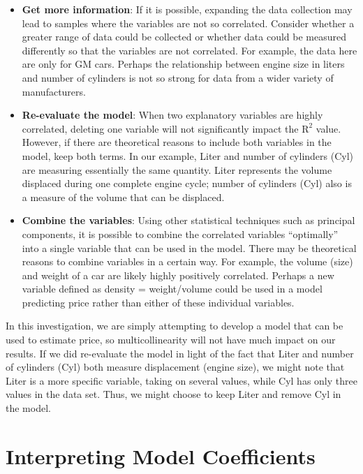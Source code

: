 \documentclass[
]{book}
\providecommand{\tightlist}{%
  \setlength{\itemsep}{0pt}\setlength{\parskip}{0pt}}
\begin{document}
\begin{itemize}
\tightlist
\item
  \textbf{Get more information}: If it is possible, expanding the data collection may lead to samples where the variables are not so correlated. Consider whether a greater range of data could be collected or whether data could be measured differently so that the variables are not correlated. For example, the data here are only for GM cars. Perhaps the relationship between engine size in liters and number of cylinders is not so strong for data from a wider variety of manufacturers.
\item
  \textbf{Re-evaluate the model}: When two explanatory variables are highly correlated, deleting one variable will not significantly impact the \(\mathrm{R}^2\) value. However, if there are theoretical reasons to include both variables in the model, keep both terms. In our example, Liter and number of cylinders (Cyl) are measuring essentially the same quantity. Liter represents the volume displaced during one complete engine cycle; number of cylinders (Cyl) also is a measure of the volume that can be displaced.
\item
  \textbf{Combine the variables}: Using other statistical techniques such as principal components, it is possible to combine the correlated variables ``optimally'' into a single variable that can be used in the model. There may be theoretical reasons to combine variables in a certain way. For example, the volume (size) and weight of a car are likely highly positively correlated. Perhaps a new variable defined as density = weight/volume could be used in a model predicting price rather than either of these individual variables.
\end{itemize}

In this investigation, we are simply attempting to develop a model that can be used to estimate price, so multicollinearity will not have much impact on our results. If we did re-evaluate the model in light of the fact that Liter and number of cylinders (Cyl) both measure displacement (engine size), we might note that Liter is a more specific variable, taking on several values, while Cyl has only three values in the data set. Thus, we might choose to keep Liter and remove Cyl in the model.

\hypertarget{interpreting-model-coefficients}{%
\section{Interpreting Model Coefficients}\label{interpreting-model-coefficients}}
\end{document}

